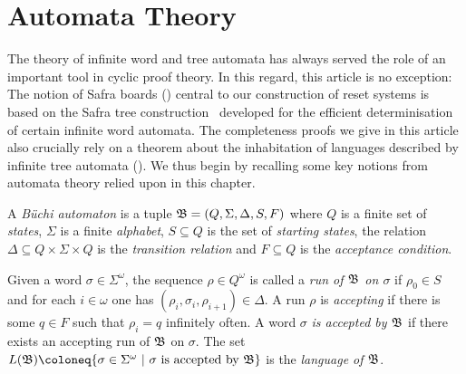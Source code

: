 \section{Automata Theory}
\label{sec:automata}

The theory of infinite word and tree automata has always served the role of an
important tool in cyclic proof theory. In this regard, this article is no
exception: The notion of Safra boards () central to our
construction of reset systems is based on the Safra tree
construction~\parencite{kozenSafraConstruction2006} developed for the efficient
determinisation of certain infinite word automata. The completeness proofs we
give in this article also crucially rely on a theorem about the inhabitation of
languages described by infinite tree automata (). We thus
begin by recalling some key notions from automata theory relied upon in this
chapter.

\begin{definition}
  A \emph{Büchi automaton} is a tuple $\mathfrak{B} = (Q, \Sigma, \Delta, S, F)$
  where $Q$ is a finite set of \emph{states}, $\Sigma$ is a finite \emph{alphabet}, $S
  \subseteq Q$ is the set of \emph{starting states}, the relation $\Delta \subseteq Q \times \Sigma
  \times Q$ is the \emph{transition relation} and $F \subseteq Q$ is
  the \emph{acceptance condition}.

  Given a word $\sigma \in \Sigma^\omega$, the sequence $\rho \in Q^\omega$
  is called a \emph{\emph{run of $\mathfrak{B}$} on $\sigma$} if $\rho_0 \in S$ and for each $i \in \omega$ one
  has $(\rho_i, \sigma_i, \rho_{i + 1}) \in \Delta$. A run $\rho$ is
  \emph{accepting} if there is some $q \in F$ such that $\rho_i = q$ infinitely
  often. A word $\sigma$ \emph{is accepted by $\mathfrak{B}$} if
  there exists an accepting run of $\mathfrak{B}$ on $\sigma$.
  The set $L(\SB) \coloneq
  \{\sigma \in \Sigma^\omega ~|~ \sigma \text{ is accepted by } \SB\}$ is the \emph{language of
    $\mathfrak{B}$}.
\end{definition}

